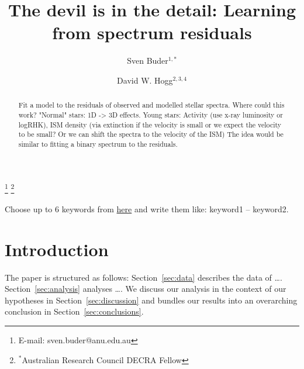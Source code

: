 \documentclass[twocolumn,apj,numberedappendix,appendixfloats]{openjournal}
\begin{document}
\title{The devil is in the detail: Learning from spectrum residuals}

\author{\vspace{-1.5cm}Sven Buder$^{1,*}$}
\author{David W. Hogg$^{2,3,4}$}




\thanks{E-mail: sven.buder@anu.edu.au}
\thanks{$^*$Australian Research Council DECRA Fellow}

\begin{abstract}
Fit a model to the residuals of observed and modelled stellar spectra. Where could this work? "Normal" stars: 1D -> 3D effects. Young stars: Activity (use x-ray luminosity or logRHK), ISM density (via extinction if the velocity is small or we expect the velocity to be small? Or we can shift the spectra to the velocity of the ISM)
The idea would be similar to fitting a binary spectrum to the residuals.
\end{abstract}

\begin{keywords}
    {Choose up to 6 keywords from \href{https://academic.oup.com/DocumentLibrary/mnras/keywords.pdf}{here} and write them like: keyword1 -- keyword2.}
\end{keywords}

\maketitle


\section{Introduction}
\label{sec:introduction}

The paper is structured as follows: Section~\ref{sec:data} describes the data of \dots. Section~\ref{sec:analysis} analyses \dots. We discuss our analysis in the context of our hypotheses in Section~\ref{sec:discussion} and bundles our results into an overarching conclusion in Section~\ref{sec:conclusions}.
\end{document}
